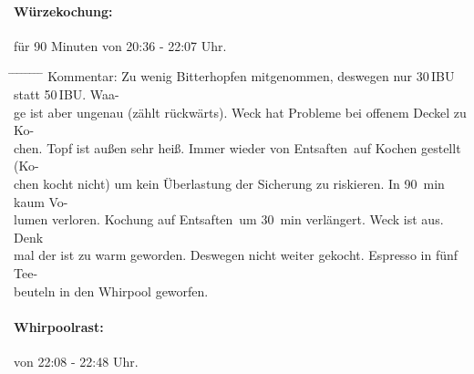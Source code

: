 \documentclass[12pt,oneside,a4paper]{scrartcl}
\begin{document}
\paragraph{Würzekochung:} für 90 Minuten von 20:36 - 22:07 Uhr.
	\begin{tabbing}
		\hspace{1cm} \= \hspace{1cm} \= \hspace{1cm} \= \hspace{1cm} \= \hspace{1cm} \= \hspace{1cm} \= \hspace{1cm} \= \hspace{1cm} \= \kill
		\> Kommentar: \> \> \> Zu wenig Bitterhopfen mitgenommen, deswegen nur 30\,IBU statt 50\,IBU. Waa-\\
		\> \> \>ge ist aber ungenau (zählt rückwärts). Weck hat Probleme bei offenem Deckel zu Ko-\\
		\> \> \>chen. Topf ist außen sehr heiß. Immer wieder von \glqq Entsaften\grqq\ auf Kochen gestellt (Ko-\\
		\>\>\>chen kocht nicht) um kein Überlastung der Sicherung zu riskieren. In \SI{90}{\minute} kaum Vo-\\
		\>\>\>lumen verloren. Kochung auf \glqq Entsaften\grqq\ um \SI{30}{\minute} verlängert. Weck ist aus. Denk\\
		\>\>\>mal der ist zu warm geworden. Deswegen nicht weiter gekocht. Espresso in fünf Tee-\\
		\>\>\>beuteln in den Whirpool geworfen.\\
	\end{tabbing}

\paragraph{Whirpoolrast:} von 22:08 - 22:48 Uhr.\\
\end{document}
